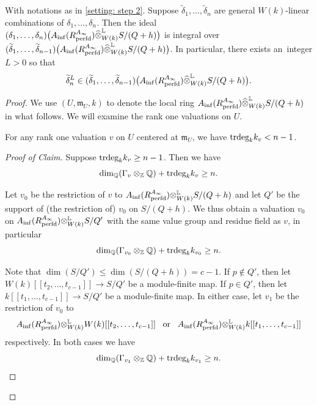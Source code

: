\documentclass[12pt]{amsart}
\numberwithin{equation}{theorem}
\numberwithin{equation}{theorem}
\renewcommand{\m}{\mathfrak{m}}
\newcommand{\perfd}{\textnormal{perfd}}
\newcommand{\trdeg}{\textnormal{trdeg}}
\begin{document}
\begin{proposition}
\label{prop: analytic spread at most n-1}
With notations as in \autoref{setting: step 2}. Suppose $\widetilde{\delta}_1,\dots, \widetilde{\delta}_n$ are general $W(k)$-linear combinations of $\delta_1,\dots,\delta_n$. Then the ideal $(\delta_1,\dots,\delta_n)\big(A_{\inf}(R^{A_\infty}_\perfd) \widehat{\otimes}^\myL_{W(k)} S/(Q+h)\big)$ is integral over $(\widetilde{\delta}_1,\dots, \widetilde{\delta}_{n-1})\big(A_{\inf}(R^{A_\infty}_\perfd) \widehat{\otimes}^\myL_{W(k)}S/(Q+h)\big)$. In particular, there exists an~integer $L>0$ so that 
$$\widetilde{\delta}_n^L \in (\widetilde{\delta}_1,\dots, \widetilde{\delta}_{n-1})\big(A_{\inf}(R^{A_\infty}_\perfd) \widehat{\otimes}^\myL_{W(k)}S/(Q+h)\big).$$
\end{proposition}
\begin{proof}
We use $(U,\m_U, k)$ to denote the local ring $A_{\inf}(R^{A_\infty}_\perfd) \widehat{\otimes}^\myL_{W(k)}S/(Q+h)$ in what follows. We will examine the rank one valuations on $U$.

\begin{claim}
\label{clm: clm in analytic spread prop}
For any rank one
valuation $v$ on $U$ centered at $\m_U$, we have $\trdeg_kk_v<n-1$.
\end{claim}
\begin{proof}[Proof of Claim]
Suppose $\trdeg_kk_v\geq n-1$. Then we have 
$$\dim_\Q(\Gamma_v\otimes_\Z\Q) + \trdeg_kk_v \geq n.$$

Let $v_0$ be the restriction of $v$ to $A_{\inf}(R^{A_\infty}_\perfd) {\otimes}^\myL_{W(k)}S/(Q+h)$ and let $Q'$ be the support of (the restriction of) $v_0$ on $S/(Q+h)$. We thus obtain a valuation $v_0$ on $A_{\inf}(R^{A_\infty}_\perfd) {\otimes}^\myL_{W(k)} S/Q'$ with the same value group and residue field as $v$, in particular
$$\dim_\Q(\Gamma_{v_0}\otimes_\Z\Q) + \trdeg_kk_{v_0} \geq n.$$

Note that $\dim(S/Q')\leq \dim(S/(Q+h))=c-1$. If $p\notin Q'$, then let $W(k)[[t_2,\dots,t_{c-1}]] \to S/Q'$ be a module-finite map. If $p\in Q'$, then let $k[[t_1,\dots,t_{c-1}]]\to S/Q'$ be a module-finite map. In either case, let $v_1$ be the restriction of $v_0$ to
$$A_{\inf}(R^{A_\infty}_\perfd) {\otimes}^\myL_{W(k)} W(k)[[t_2,\dots,t_{c-1}]] \,\ \text{ or } \,\ A_{\inf}(R^{A_\infty}_\perfd) {\otimes}^\myL_{W(k)} k[[t_1,\dots,t_{c-1}]]$$
respectively. In both cases we have 
$$\dim_\Q(\Gamma_{v_1}\otimes_\Z\Q) + \trdeg_kk_{v_1} \geq n.$$


\end{proof}
\end{proof}
\end{document}
